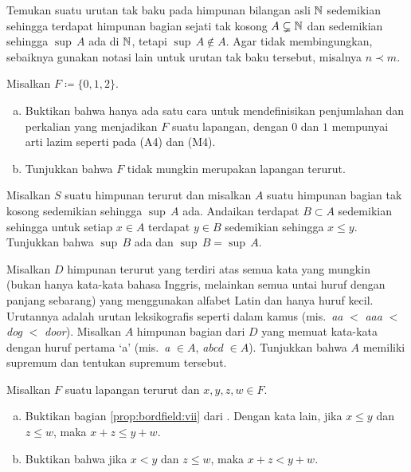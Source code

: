 \begin{exercise}
Temukan suatu urutan tak baku pada himpunan bilangan asli ${\mathbb{N}}$
sedemikian sehingga terdapat himpunan bagian sejati tak kosong $A \subsetneq {\mathbb{N}}$
dan sedemikian sehingga $\sup\, A$ ada di ${\mathbb{N}}$, tetapi $\sup\, A \notin A$.
Agar tidak membingungkan, sebaiknya gunakan notasi lain
untuk urutan tak baku tersebut, misalnya $n \prec m$.
\end{exercise}

\begin{exercise}
\pagebreak[2]
Misalkan $F \coloneqq \{ 0, 1, 2 \}$.
\begin{enumerate}[a)]
\item
Buktikan bahwa hanya ada
satu cara untuk mendefinisikan penjumlahan dan perkalian yang menjadikan $F$ suatu
lapangan, dengan $0$ dan $1$ mempunyai arti lazim seperti pada (A4) dan (M4).
\item
Tunjukkan bahwa $F$ tidak mungkin merupakan lapangan terurut.
\end{enumerate}
\end{exercise}

\begin{exercise} \label{exercise:dominatingb}
\pagebreak[2]
Misalkan $S$ suatu himpunan terurut dan
misalkan $A$ suatu himpunan bagian tak kosong sedemikian sehingga $\sup \, A$ ada.  Andaikan terdapat
$B \subset A$ sedemikian sehingga untuk setiap $x \in A$ terdapat $y \in B$
sedemikian sehingga $x \leq y$.  Tunjukkan bahwa $\sup \, B$ ada dan $\sup \, B = \sup \, A$.
\end{exercise}

\begin{exercise}
Misalkan $D$ himpunan terurut yang terdiri atas semua kata yang mungkin (bukan hanya kata-kata bahasa Inggris,
melainkan semua untai huruf dengan panjang sebarang)
yang menggunakan alfabet Latin dan hanya huruf kecil.  Urutannya adalah
urutan leksikografis seperti dalam kamus (mis.\ \emph{aa} $<$ \emph{aaa} $<$ \emph{dog} $<$ \emph{door}).
Misalkan $A$ himpunan bagian dari $D$ yang memuat kata-kata dengan
huruf pertama `a' (mis.\ \emph{a} $\in A$, \emph{abcd} $\in A$).
Tunjukkan bahwa $A$ memiliki supremum dan tentukan supremum tersebut.
\end{exercise}

\begin{exercise}
Misalkan $F$ suatu lapangan terurut dan $x,y,z,w \in F$.
\begin{enumerate}[a)]
\item
Buktikan bagian \ref{prop:bordfield:vii} dari .
Dengan kata lain,
jika $x \leq y$ dan $z \leq w$, maka $x+z \leq y+w$.
\item
Buktikan bahwa
jika $x < y$ dan $z \leq w$, maka $x+z < y+w$.
\end{enumerate}
\end{exercise}

